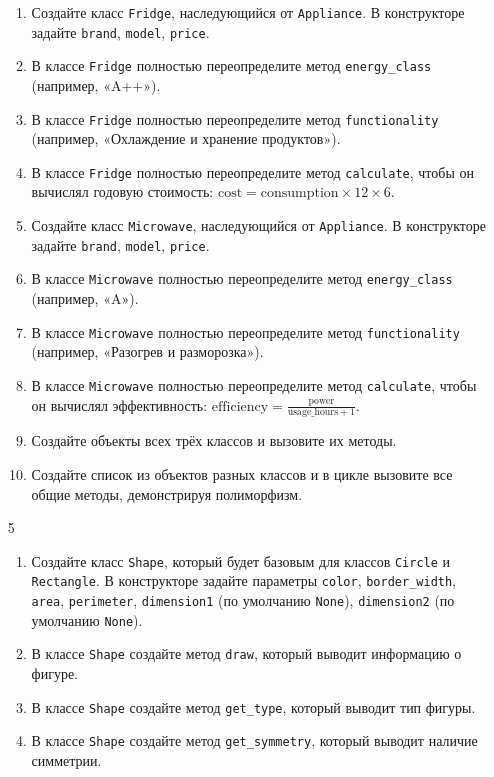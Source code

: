 \begin{enumerate}
\begin{enumerate}
    \item Создайте класс \texttt{Fridge}, наследующийся от \texttt{Appliance}. В конструкторе задайте \texttt{brand}, \texttt{model}, \texttt{price}.
    \item В классе \texttt{Fridge} полностью переопределите метод \texttt{energy\_class} (например, «A++»).
    \item В классе \texttt{Fridge} полностью переопределите метод \texttt{functionality} (например, «Охлаждение и хранение продуктов»).
    \item В классе \texttt{Fridge} полностью переопределите метод \texttt{calculate}, чтобы он вычислял годовую стоимость: \( \text{cost} = \text{consumption} \times 12 \times 6 \).
    \item Создайте класс \texttt{Microwave}, наследующийся от \texttt{Appliance}. В конструкторе задайте \texttt{brand}, \texttt{model}, \texttt{price}.
    \item В классе \texttt{Microwave} полностью переопределите метод \texttt{energy\_class} (например, «A»).
    \item В классе \texttt{Microwave} полностью переопределите метод \texttt{functionality} (например, «Разогрев и разморозка»).
    \item В классе \texttt{Microwave} полностью переопределите метод \texttt{calculate}, чтобы он вычислял эффективность: \( \text{efficiency} = \frac{\text{power}}{\text{usage\_hours} + 1} \).
    \item Создайте объекты всех трёх классов и вызовите их методы.
    \item Создайте список из объектов разных классов и в цикле вызовите все общие методы, демонстрируя полиморфизм.
\end{enumerate}
\item[5]
\begin{enumerate}
    \item Создайте класс \texttt{Shape}, который будет базовым для классов \texttt{Circle} и \texttt{Rectangle}. В конструкторе задайте параметры \texttt{color}, \texttt{border\_width}, \texttt{area}, \texttt{perimeter}, \texttt{dimension1} (по умолчанию \texttt{None}), \texttt{dimension2} (по умолчанию \texttt{None}).
    \item В классе \texttt{Shape} создайте метод \texttt{draw}, который выводит информацию о фигуре.
    \item В классе \texttt{Shape} создайте метод \texttt{get\_type}, который выводит тип фигуры.
    \item В классе \texttt{Shape} создайте метод \texttt{get\_symmetry}, который выводит наличие симметрии.

\end{enumerate}
\end{enumerate}
